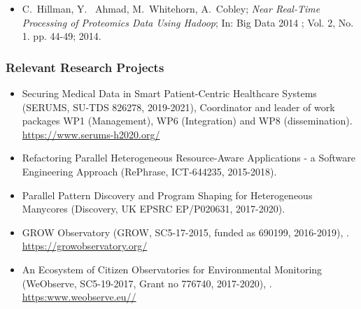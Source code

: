 \documentclass[a4paper,11pt]{article}
\begin{document}
\begin{itemize}
\item C.~Hillman, Y.~ Ahmad, M.~Whitehorn, A.~Cobley; \emph{Near Real-Time Processing of Proteomics Data Using Hadoop}; In: Big Data 2014 ; Vol. 2, No. 1. pp. 44-49; 2014.

\end{itemize}
\subsubsection*{Relevant Research Projects}

\begin{itemize}
\item Securing Medical Data in Smart Patient-Centric Healthcare Systems (SERUMS, SU-TDS 826278, 2019-2021), Coordinator and leader of work packages WP1 (Management), WP6 (Integration) and WP8 (dissemination). \url{https://www.serums-h2020.org/}

\item Refactoring Parallel Heterogeneous Resource-Aware Applications - a Software Engineering Approach (RePhrase, ICT-644235, 2015-2018).

\item Parallel Pattern Discovery and Program Shaping for Heterogeneous Manycores (Discovery, UK EPSRC EP/P020631, 2017-2020).

\item GROW Observatory (GROW, SC5-17-2015, funded as 690199, 2016-2019), . \url{https://growobservatory.org/}


\item An Ecosystem of Citizen Observatories for Environmental Monitoring (WeObserve, SC5-19-2017, Grant no 776740, 2017-2020), . \url{https:www.weobserve.eu//}
\end{itemize}
\end{document}
